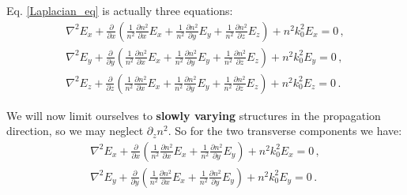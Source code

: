 \documentclass[]{article}
\begin{document}
	Eq. \eqref{Laplacian_eq} is actually three equations:
	\begin{subequations}
		\begin{align}
			\nabla^2 E_x + \frac{\partial}{\partial x}\left(\frac{1}{n^2}\frac{\partial n^2}{\partial x} E_x+\frac{1}{n^2}\frac{\partial n^2}{\partial y} E_y+\frac{1}{n^2}\frac{\partial n^2}{\partial z} E_z \right)+n^2 k_0^2 E_x = 0\, ,\\ 
			\nabla^2 E_y + \frac{\partial}{\partial y}\left(\frac{1}{n^2}\frac{\partial n^2}{\partial x} E_x+\frac{1}{n^2}\frac{\partial n^2}{\partial y} E_y+\frac{1}{n^2}\frac{\partial n^2}{\partial z} E_z \right)+n^2 k_0^2 E_y = 0\, ,\\
			\nabla^2 E_z + \frac{\partial}{\partial z}\left(\frac{1}{n^2}\frac{\partial n^2}{\partial x} E_x+\frac{1}{n^2}\frac{\partial n^2}{\partial y} E_y+\frac{1}{n^2}\frac{\partial n^2}{\partial z} E_z \right)+n^2 k_0^2 E_z = 0\, .
		\end{align}
	\end{subequations}
	
	We will now limit ourselves to \textbf{slowly varying} structures in the propagation direction, so we may neglect $\partial_z n^2$. So for the two transverse components we have:
	\begin{subequations}
		\begin{align}
			\nabla^2 E_x + \frac{\partial}{\partial x}\left(\frac{1}{n^2}\frac{\partial n^2}{\partial x} E_x+\frac{1}{n^2}\frac{\partial n^2}{\partial y} E_y \right)+n^2 k_0^2 E_x = 0\, ,\\ 
			\nabla^2 E_y + \frac{\partial}{\partial y}\left(\frac{1}{n^2}\frac{\partial n^2}{\partial x} E_x+\frac{1}{n^2}\frac{\partial n^2}{\partial y} E_y \right)+n^2 k_0^2 E_y = 0\, .
		\end{align}
		\label{main_eqs}
	\end{subequations}
	
	
\end{document}
